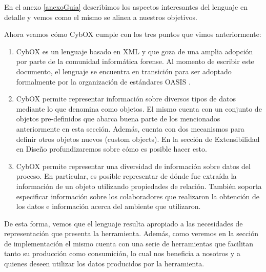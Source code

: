 En el anexo \ref{anexoGuia} describimos los aspectos interesantes del lenguaje en detalle y vemos como el mismo se alinea a nuestros objetivos.

Ahora veamos cómo CybOX cumple con los tres puntos que vimos anteriormente:

\begin{enumerate}
\item CybOX es un lenguaje basado en XML y que goza de una amplia adopción por parte de la comunidad informática forense. Al momento de escribir este documento, el lenguaje se encuentra en transición para ser adoptado formalmente por la organización de estándares OASIS \cite{stixtrans}.
\item CybOX permite representar información sobre diversos tipos de datos mediante lo que denomina como objetos. El mismo cuenta con un conjunto de objetos pre-definidos que abarca buena parte de los mencionados anteriormente en esta sección. Además, cuenta con dos mecanismos para definir otros objetos nuevos (custom objects). En la sección de Extensibilidad en Diseño profundizaremos sobre cómo es posible hacer esto.
\item CybOX permite representar una diversidad de información sobre datos del proceso. En particular, es posible representar de dónde fue extraída la información de un objeto utilizando propiedades de relación. También soporta especificar información sobre los colaboradores que realizaron la obtención de los datos e información acerca del ambiente que utilizaron.
\end{enumerate}

De esta forma, vemos que el lenguaje resulta apropiado a las necesidades de representación que presenta la herramienta. Además, como veremos en la sección de implementación el mismo cuenta con una serie de herramientas \cite{cyboxpry} que facilitan tanto su producción como consumición, lo cual nos beneficia a nosotros y a quienes deseen utilizar los datos producidos por la herramienta.